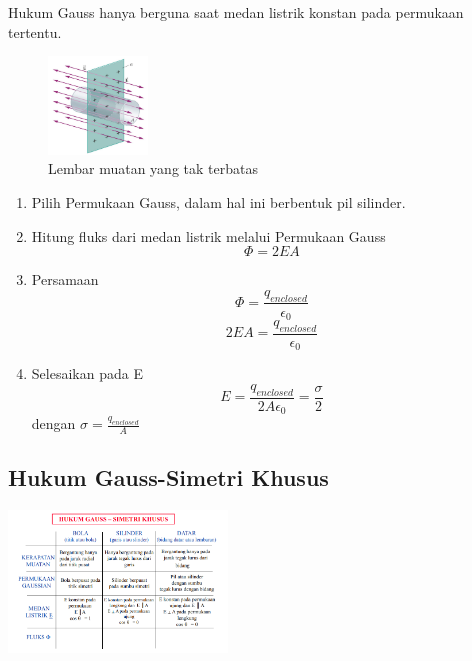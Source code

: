 \documentclass[twocolumn, 11pt]{article}%
\begin{document}
    Hukum Gauss hanya berguna saat medan listrik konstan pada permukaan tertentu.

    \begin{figure}[h!]
        \centering
        \includegraphics[width=100px]{11.png}\\
        Lembar muatan yang tak terbatas
    \end{figure}

    \begin{enumerate}
        \item Pilih Permukaan Gauss, dalam hal ini berbentuk pil silinder.
        \item Hitung fluks dari medan listrik melalui Permukaan Gauss
            \[ \Phi = 2EA \]
        \item Persamaan
            \[ \Phi = \frac{q_{enclosed}}{\epsilon_0} \]
            \[ 2EA=\frac{q_{enclosed}}{\epsilon_0} \]
        \item Selesaikan pada E
            \[ E=\frac{q_{enclosed}}{2A\epsilon_0}=\frac{\sigma}{2} \]
            dengan $\displaystyle\sigma=\frac{q_{enclosed}}{A}$
    \end{enumerate}

    \subsection{Hukum Gauss-Simetri Khusus}%
    \begin{center}
        \includegraphics[width=220px]{12.png}
    \end{center}
\end{document}
